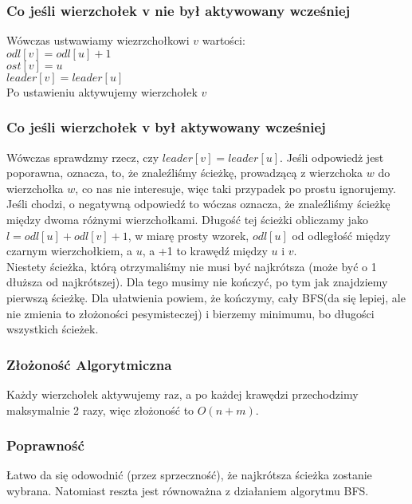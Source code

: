 \documentclass{article}
\begin{document}
\subsubsection{Co jeśli wierzchołek v nie był aktywowany wcześniej}
Wówczas ustwawiamy wiezrzchołkowi $v$ wartości: \\
$odl[v] = odl[u] + 1$ \\
$ost[v] = u$ \\
$leader[v] = leader[u]$ \\
Po ustawieniu aktywujemy wierzchołek $v$
\subsubsection{Co jeśli wierzchołek v był aktywowany wcześniej}
Wówczas sprawdzmy rzecz, czy $leader[v] = leader[u]$. Jeśli odpowiedż jest poporawna, oznacza, to, że znaleźliśmy ścieżkę, prowadzącą z wierzchoka $w$ do wierzchołka $w$, co nas nie interesuje, więc taki przypadek po prostu ignorujemy.\\
Jeśli chodzi, o negatywną odpowiedź to wóczas oznacza, że znaleźliśmy ścieżkę między dwoma różnymi wierzchołkami. Długość tej ścieżki obliczamy jako $l = odl[u] + odl[v] + 1$, w miarę prosty wzorek, $odl[u]$ od odległość między czarnym wierzchołkiem, a $u$, a +1 to krawędź między $u$  i $v$. \\
Niestety ścieżka, którą otrzymaliśmy nie musi być najkrótsza (może być o 1 dłuższa od najkrótszej). Dla tego musimy nie kończyć, po tym jak znajdziemy pierwszą ścieżkę. Dla ułatwienia powiem, że kończymy, cały BFS(da się lepiej, ale nie zmienia to złożoności pesymisteczej) i bierzemy minimumu, bo długości wszystkich ścieżek. 

\subsubsection{Złożoność Algorytmiczna}
Każdy wierzchołek aktywujemy raz, a po każdej krawędzi przechodzimy maksymalnie 2 razy, więc złożoność to $O(n+m)$.

\subsubsection{Poprawność}
Łatwo da się odowodnić (przez sprzeczność), że najkrótsza ścieżka zostanie wybrana. Natomiast reszta jest równoważna z działaniem algorytmu BFS.
\end{document}
